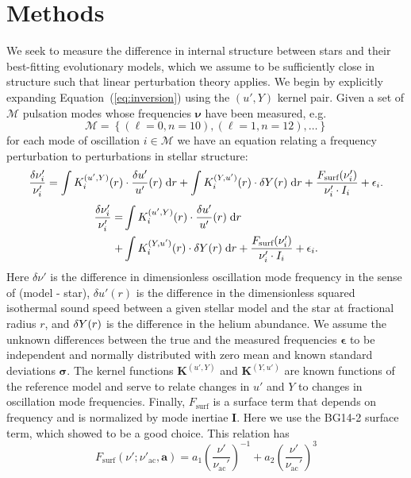 \section{Methods}
We seek to measure the difference in internal structure between stars and their best-fitting evolutionary models, which we assume to be sufficiently close in structure such that linear perturbation theory applies. 
We begin by explicitly expanding Equation~(\ref{eq:inversion}) using the ${(u', Y)}$ kernel pair. 
Given a set of $\mathscr{M}$ pulsation modes whose frequencies $\boldsymbol\nu$ have been measured, e.g.\ $$\mathscr{M}=\left\{(\ell=0, n=10), (\ell=1, n=12), \ldots\right\}$$ for each mode of oscillation ${i\in\mathscr{M}}$ we have an equation relating a frequency perturbation to perturbations in stellar structure: 
\ifhbonecolumn
\begin{equation} \label{eq:forward2} 
         \frac{\delta\nu_i'}{\nu_i'} 
         = 
          \int K_i^{(u',Y)}(r) \cdot \frac{\delta u'}{u'}(r) \; \text{d}r 
         +\int K_i^{(Y,u')}(r) \cdot \delta Y(r)  \; \text{d}r 
         +\frac{F_{\text{surf}}(\nu_i')}{\nu_i'\cdot I_i} 
         +\epsilon_i. 
\end{equation} 
\else
\begin{align} \label{eq:forward2} 
         \frac{\delta\nu_i'}{\nu_i'} 
         = 
         &\int K_i^{(u',Y)}(r) \cdot \frac{\delta u'}{u'}(r) \; \text{d}r 
\notag\\+&\int K_i^{(Y,u')}(r) \cdot \delta Y(r)  \; \text{d}r 
         +\frac{F_{\text{surf}}(\nu_i')}{\nu_i'\cdot I_i} 
         +\epsilon_i. 
\end{align} 
\fi
Here $\delta \nu'$ is the difference in dimensionless oscillation mode frequency in the sense of (model - star), 
$\delta u'(r)$ is the difference in the dimensionless squared isothermal sound speed between a given stellar model and the star at fractional radius $r$, 
and $\delta Y(r)$ is the difference in the helium abundance. 
We assume the unknown differences between the true and the measured frequencies $\boldsymbol\epsilon$ to be independent and normally distributed with zero mean and known standard deviations $\boldsymbol{\sigma}$. 
The kernel functions $\boldsymbol{K}^{(u', Y)}$ and $\boldsymbol{K}^{(Y, u')}$ are known functions of the reference model and serve to relate changes in $u'$ and $Y$ to changes in oscillation mode frequencies. 
Finally, $F_{\text{surf}}$ is a surface term that depends on frequency and is normalized by mode inertiae $\boldsymbol{I}$. Here we use the BG14-2 surface term, which \citet{2015ApJ...808..123S} showed to be a good choice. This relation has 
\begin{equation}
    F_{\text{surf}}(\nu'; \nu'_{\text{ac}}, \mathbf a) = 
           a_1 \left( \frac{\nu'}{\nu_{\text{ac}}'} \right)^{-1} 
         + a_2 \left( \frac{\nu'}{\nu_{\text{ac}}'} \right)^3 
\end{equation}
